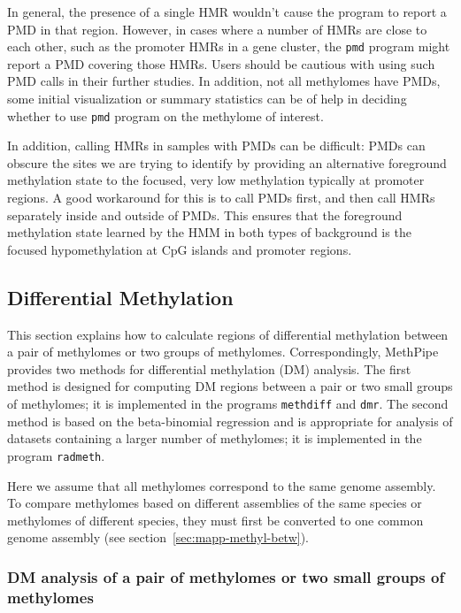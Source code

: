 \documentclass[10pt]{article}
\newcommand{\prog}[1]{\texttt{#1}}
\begin{document}
In general, the presence of a single HMR wouldn't cause the program to
report a PMD in that region. However, in cases where a number of HMRs
are close to each other, such as the promoter HMRs in a gene cluster,
the \prog{pmd} program might report a PMD covering those HMRs. Users
should be cautious with using such PMD calls in their further
studies. In addition, not all methylomes have PMDs, some initial
visualization or summary statistics can be of help in deciding whether
to use \prog{pmd} program on the methylome of interest.

In addition, calling HMRs in samples with PMDs can be difficult: PMDs
can obscure the sites we are trying to identify by providing an alternative
foreground methylation state to the focused, very low methylation typically
at promoter regions. A good workaround for this is to call PMDs first, and
then call HMRs separately inside and outside of PMDs. This ensures that
the foreground methylation state learned by the HMM in both types of background
is the focused hypomethylation at CpG islands and promoter regions.

\subsection{Differential Methylation}
\label{sec:differential_methylation}

This section explains how to calculate regions of differential methylation 
between a pair of methylomes or two groups of methylomes. Correspondingly, 
MethPipe provides two methods for differential methylation (DM) analysis. 
The first method is designed for computing DM regions between a pair or two 
small groups of methylomes; it is implemented in the programs \prog{methdiff} 
and \prog{dmr}. The second method is based on the beta-binomial 
regression and is appropriate for analysis of datasets containing a larger 
number of methylomes; it is implemented in the program \prog{radmeth}.

Here we assume that all methylomes correspond to the same genome 
assembly. To compare methylomes based on different assemblies of the 
same species or methylomes of different species, they must first be 
converted to one common genome assembly (see 
section~\ref{sec:mapp-methyl-betw}).

\subsubsection{DM analysis of a pair of methylomes or two small groups of 
			   methylomes}
\end{document}
